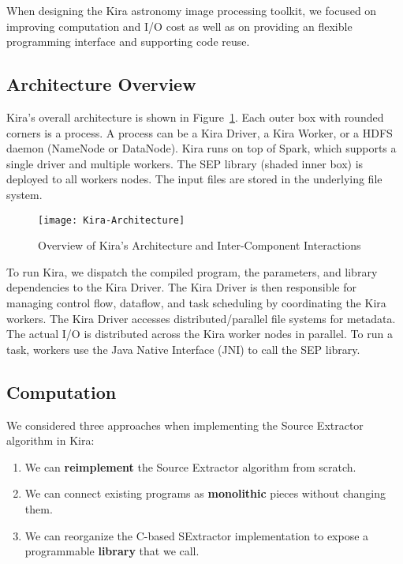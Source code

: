 \documentclass[conference]{IEEEtran}
\begin{document}
When designing the Kira astronomy image processing toolkit, 
we focused on improving computation and  I/O cost as well as on providing an flexible programming interface and supporting code reuse.


\subsection{Architecture Overview}
\label{sec:Design-Overview}




Kira's overall architecture is shown in Figure~\ref{fig:architecture}. 
Each outer box with rounded corners is a process. A process can be
a Kira Driver, a Kira Worker, or a HDFS daemon (NameNode or DataNode).
Kira runs on top of Spark, which supports a single driver and multiple workers.
The SEP library (shaded inner box) is deployed to all workers nodes. The input files are
stored in the underlying file system.

\begin{figure}[t]
	\begin{center}
		\texttt{[image: Kira-Architecture]}
		\caption{Overview of Kira's Architecture and Inter-Component Interactions}
		\label{fig:architecture}
  	\end{center}
\end{figure}


To run Kira, we dispatch the compiled program, the parameters, and library dependencies to the Kira Driver.
The Kira Driver is then responsible for managing control flow, dataflow, and task scheduling 
by coordinating the Kira workers. 
The Kira Driver accesses distributed/parallel file systems for metadata.
The actual I/O is distributed across the Kira worker nodes in
parallel. To run a task, workers use the Java Native Interface (JNI) to call the SEP library.

\subsection{Computation}
\label{sec:Design-Computation}
We considered three approaches when implementing the Source Extractor algorithm in Kira:

\begin{enumerate}
\item We can \textbf{reimplement} the Source Extractor algorithm from scratch.
\item We can connect existing programs as \textbf{monolithic} pieces without changing them.
\item We can reorganize the C-based SExtractor implementation to expose a programmable
\textbf{library} that we call.
\end{enumerate}
\end{document}
